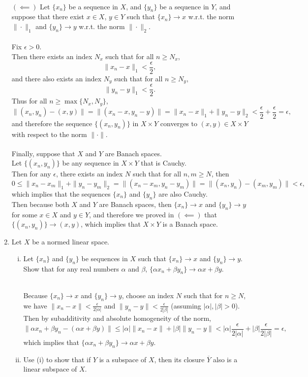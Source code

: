 \begin{enumerate}
    \\$(\impliedby)$ Let $\{x_n\}$ be a sequence in $X$, and $\{y_n\}$ be a sequence in $Y$, and suppose that there exist $x\in X$, $y\in Y$ such that $\{x_n\}\to x$ w.r.t. the norm $\|\cdot\|_1$ and $\{y_n\}\to y$ w.r.t. the norm $\|\cdot\|_2$.\\
    \\Fix $\epsilon>0$.
    \\Then there exists an index $N_x$ such that for all $n\ge N_x$,
    \[
        \|x_n-x\|_1<\frac{\epsilon}{2},
    \]
    and there also exists an index $N_y$ such that for all $n\ge N_y$,
    \[
        \|y_n-y\|_1<\frac{\epsilon}{2}.
    \]
    Thus for all $n\ge\max\{N_x,N_y\}$,
    \[
        \|(x_n,y_n)-(x,y)\|=\|(x_n-x,y_n-y)\|=\|x_n-x\|_1+\|y_n-y\|_2<\frac{\epsilon}{2}+\frac{\epsilon}{2}=\epsilon,
    \]
    and therefore the sequence $\{(x_n,y_n)\}$ in $X\times Y$ converges to $(x,y)\in X\times Y$ with respect to the norm $\|\cdot\|$.\\
    \\Finally, suppose that $X$ and $Y$ are Banach spaces.
    \\Let $\{(x_n,y_n)\}$ be any sequence in $X\times Y$ that is Cauchy.
    \\Then for any $\epsilon$, there exists an index $N$ such that for all $n,m\ge N$, then
    \[
        0\le\|x_n-x_m\|_1+\|y_n-y_m\|_2=\|(x_n-x_m,y_n-y_m)\|=\|(x_n,y_n)-(x_m,y_m)\|<\epsilon,
    \]
    which implies that the sequences $\{x_n\}$ and $\{y_n\}$ are also Cauchy.
    \\Then because both $X$ and $Y$ are Banach spaces, then $\{x_n\}\to x$ and $\{y_n\}\to y$ for some $x\in X$ and $y\in Y$, and therefore we proved in $(\impliedby)$ that $\{(x_n,y_n)\}\to(x,y)$, which implies that $X\times Y$ is a Banach space.
    \ \\\item Let $X$ be a normed linear space.
    \begin{enumerate}[(i)]
        \item Let $\{x_n\}$ and $\{y_n\}$ be sequences in $X$ such that $\{x_n\}\to x$ and $\{y_n\}\to y$.
        Show that for any real numbers $\alpha$ and $\beta$, $\{\alpha x_n+\beta y_n\}\to\alpha x+\beta y$.

        \ \\Because $\{x_n\}\to x$ and $\{y_n\}\to y$, choose an index $N$ such that for $n\ge N$, we have $\|x_n-x\|<\frac{\epsilon}{2|\alpha|}$ and $\|y_n-y\|<\frac{\epsilon}{2|\beta|}$ (assuming $|\alpha|,|\beta|>0$).
        Then by subadditivity and absolute homogeneity of the norm,
        \[
            \|\alpha x_n+\beta y_n-(\alpha x+\beta y)\|
            \le|\alpha|\| x_n-x\|+|\beta| \|y_n-y\|
            <|\alpha|\frac{\epsilon}{2|\alpha|}+|\beta|\frac{\epsilon}{2|\beta|}
            =\epsilon,
        \]
        which implies that $\{\alpha x_n+\beta y_n\}\to\alpha x+\beta y$.
        \\\item Use (i) to show that if $Y$ is a subspace of $X$, then its closure $\overline{Y}$ also is a linear subspace of $X$.
    

\end{enumerate}
\end{enumerate}
